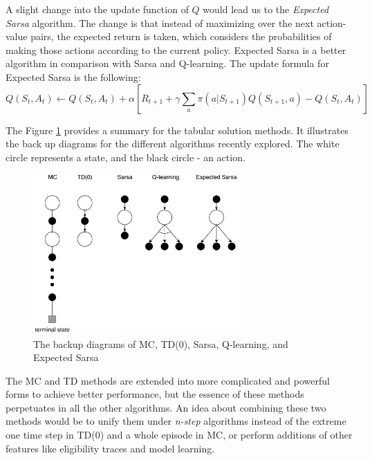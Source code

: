 A slight change into the update function of $Q$ would lead us to the \textit{Expected Sarsa} algorithm. The change is that instead of maximizing over the next action-value pairs, the expected return is taken, which considers the probabilities of making those actions according to the current policy. Expected Sarsa is a better algorithm in comparison with Sarsa and Q-learning. The update formula for Expected Sarsa is the following:
\begin{equation}\label{ESarsa}
Q(S_{t}, A_{t})\leftarrow Q(S_{t}, A_{t})+\alpha \left [ R_{t+1}+ \gamma \sum_{a}\pi(a|S_{t+1}) Q(S_{t+1}, a)-Q(S_{t}, A_{t}) \right ]
\end{equation}

The Figure \ref{fig:BackupDiagrams} provides a summary for the tabular solution methods. It illustrates the back up diagrams for the different algorithms recently explored. The white circle represents a state, and the black circle - an action.
\begin{figure}[H]
	\centering
	\includegraphics[width=0.7\textwidth]{Figures/BackupDiagrams}
	\caption{The backup diagrams of MC, TD(0), Sarsa, Q-learning, and Expected Sarsa}
	\label{fig:BackupDiagrams}
\end{figure}

The MC and TD methods are extended into more complicated and powerful forms to achieve better performance, but the essence of these methods perpetuates in all the other algorithms. An idea about combining these two methods would be to unify them under \textit{n-step} algorithms instead of the extreme one time step in TD(0) and a whole episode in MC, or perform additions of other features like eligibility traces and model learning.
	

